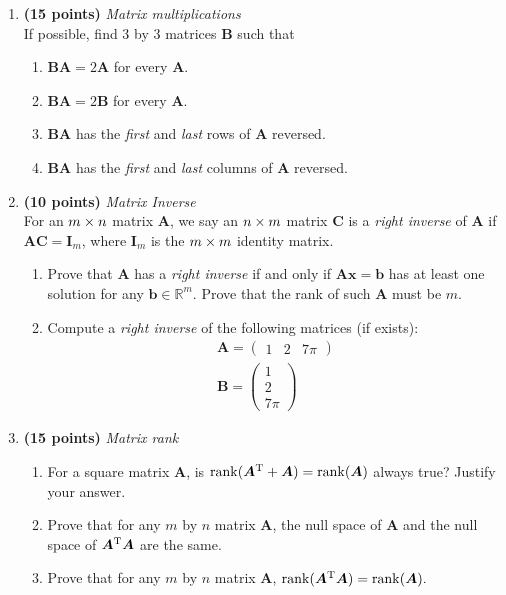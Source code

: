 \begin{enumerate}
\newpage
\item \textbf{(15 points)} \textit{Matrix multiplications}\\
If possible, find 3 by 3 matrices $\bm B$ such that
\begin{enumerate}
\item
$\bm{BA}=2\bm A$ for every $\bm A$.\\
\item
$\bm{BA}=2\bm B$ for every $\bm A$.\\
\item
$\bm{BA}$ has the \textit{first} and \textit{last} rows of $\bm A$ reversed.\\
\item
$\bm{BA}$ has the \textit{first} and \textit{last} columns of $\bm A$ reversed.
\end{enumerate}




\newpage
\item \textbf{(10 points)} \textit{Matrix Inverse}\\
For an $m\times n$ matrix $\bm A$, we say an $n\times m$ matrix $\bm C$ is a \textit{right inverse} of $\bm A$ if $\bm{AC}=\bm I_m$, where $\bm I_m$ is the $m\times m$ identity matrix.
\begin{enumerate}
\item
Prove that $\bm A$ has a \textit{right inverse} if and only if $\bm{Ax}=\bm b$ has at least one solution for any $\bm b\in\mathbb{R}^m$. Prove that the rank of such $\bm A$ must be $m$.\\
\item
Compute a \textit{right inverse} of the following matrices (if exists):
\begin{gather*}
\bm A=\begin{pmatrix}
1&2&7\pi
\end{pmatrix}\\
\bm B=\begin{pmatrix}
1\\2\\7\pi
\end{pmatrix}
\end{gather*}
\end{enumerate}


\newpage
\item \textbf{(15 points)} \textit{Matrix rank}\\
\begin{enumerate}
\item
For a square matrix $\bm A$, is $\operatorname{rank}(\bm A^{\mathrm T}+\bm A)=\operatorname{rank}(\bm A)$ always true? Justify your answer.\\
\item
Prove that for any $m$ by $n$ matrix $\bm A$, the null space of $\bm A$ and the null space of $\bm A^{\mathrm T}\bm A$ are the same.\\
\item
Prove that for any $m$ by $n$ matrix $\bm A$, $\operatorname{rank}(\bm A^{\mathrm T}\bm A)=\operatorname{rank}(\bm A).$
\end{enumerate}




\end{enumerate}
